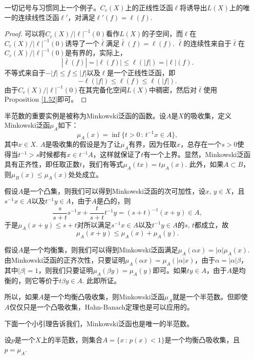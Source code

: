 \begin{lem}
	一切记号与习惯同上一个例子。$C_c(X)$上的正线性泛函$\ell$将诱导出$L(X)$上的唯一的连续线性泛函$\ell'$，对满足$\ell'(f)=\ell(f)$.
\end{lem}

\begin{proof}
	可以将$C_c(X)/|\ell|^{-1}(0)$看作$L(X)$的子空间，而$\ell$在$C_c(X)/|\ell|^{-1}(0)$诱导了一个$\bar{\ell}$满足$\bar{\ell}(f)=\ell(f)$. $\bar{\ell}$的连续性来自于$\bar{\ell}$在$C_c(X)/|\ell|^{-1}(0)$是有界的，实际上，
	\[
	|\bar{\ell}(f)|=|\ell(f)|\leq \ell(|f|)=|\ell|(f).
	\]
	不等式来自于$-|f|\leq f\leq |f|$以及$\ell$是一个正线性泛函，即
	\[
	-\ell(|f|)\leq \ell(f)\leq \ell(|f|).
	\]
	由于$C_c(X)/|\ell|^{-1}(0)$在其完备化空间$L(X)$中稠密，然后对$\bar{\ell}$使用Proposition \ref{1.52}即可。
\end{proof}

\begin{para}
半范数的重要实例是被称为Minkowski泛函的函数。设$A$是$X$的吸收集，定义Minkowski泛函$\mu_A$如下：
\[
	\mu_A(x)=\inf\{t>0\,:\,t^{-1}x\in A\},
\]
其中$x\in X$. $A$是吸收集的假设是为了让$\mu_A$有界，因为任取$x$，总存在一个$s>0$使得当$t^{-1}>s$时候都有$x\in t^{-1}A$，这样就保证了$t$有一个上界。显然，Minkowski泛函具有正齐性，即任取正数$t$，我们有等式$\mu_A(tx)=t\mu_A(x)$. 此外，如果$A\subset B$，则$\mu_B(x)\leq \mu_A(x)$处处成立。

假设$A$是一个凸集，则我们可以得到Minkowski泛函的次可加性，设$x$, $y\in X$，且$s^{-1}x\in A$以及$t^{-1}y\in A$，由于$A$是凸的，则
\[
	\frac{s}{s+t}s^{-1}x+\frac{t}{s+t}t^{-1}y=(s+t)^{-1}(x+y)\in A,
\]
于是$\mu_A(x+y)\leq s+t$对所以满足$s^{-1}x\in A$以及$t^{-1}y\in A$的$s$, $t$都成立，故
\[
	\mu_A(x+y)\leq \mu_A(x)+\mu_A(y).
\]

假设$A$是一个均衡集，则我们可以得到Minkowski泛函满足$\mu_A(\alpha x)=|\alpha|\mu_A(x)$. 由Minkowski泛函的正齐次性，只要证明$\mu_A(\alpha x)=\mu_A(|\alpha| x)$，由于$\alpha=|\alpha|\beta$，其中$|\beta|=1$，则我们只要证明$\mu_A(\beta y)=\mu_A(y)$即可。如果$ty\in A$，由于$A$是均衡的，则它等价于$t\beta y\in A$. 此即所证。

所以，如果$A$是一个均衡凸吸收集，则Minkowski泛函$\mu_A$就是一个半范数。但即使$A$仅仅只是一个凸吸收集，Hahn-Banach定理也是可以应用的。
\end{para}

下面一个小引理告诉我们，Minkowski泛函也是唯一的半范数。

\begin{lem}
设$p$是一个$X$上的半范数，则集合$A=\{x\,:\, p(x)<1\}$是一个均衡凸吸收集，且$p=\mu_A$.
\end{lem}

